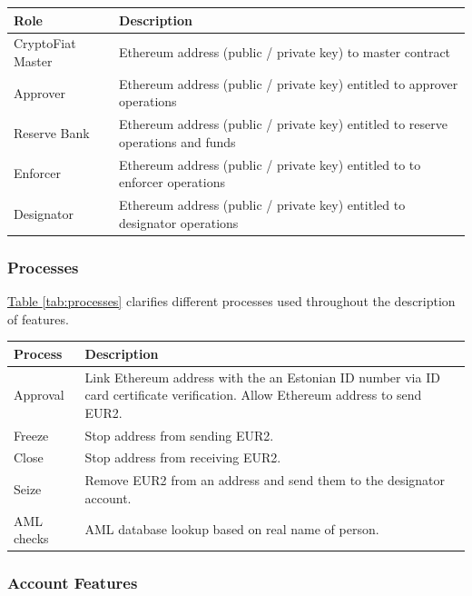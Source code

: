 \documentclass[a4paper,12pt]{article} %
\newcommand{\hypertableref}[1]{\hyperref[#1]{Table \ref{#1}}}
\begin{document}
{{\begin{center}
\begin{tabular}{ | p{3cm} | p{12cm} | }
 \hline
 Role & Description
 \\ \hline\hline
 CryptoFiat Master & Ethereum address (public / private key) to master contract
 \\ \hline
 Approver & Ethereum address (public / private key) entitled to approver operations
 \\ \hline
 Reserve Bank & Ethereum address (public / private key) entitled to reserve operations and funds
 \\ \hline
 Enforcer & Ethereum address (public / private key) entitled to to enforcer operations
 \\ \hline
 Designator & Ethereum address (public / private key) entitled to designator operations
 \\ \hline
\end{tabular}
\end{center}
\label{tab:roles}

\subsubsection{Processes} \label{sssec:3.3:processes}

\hypertableref{tab:processes} clarifies different processes used throughout the description of features.

\begin{center}
\begin{tabular}{ | p{3cm} | p{12cm} | }
 \hline
 Process & Description
 \\ \hline\hline
 Approval & Link Ethereum address with the an Estonian ID number via ID card certificate verification. Allow Ethereum address to send EUR2.
 \\ \hline
 Freeze & Stop address from sending EUR2.
 \\ \hline
 Close & Stop address from receiving EUR2.
 \\ \hline
 Seize & Remove EUR2 from an address and send them to the designator account.
 \\ \hline
 AML checks & AML database lookup based on real name of person.
 \\ \hline
\end{tabular}
\end{center}
\label{tab:processes}

\subsubsection{Account Features} \label{sssec:3.3:accounts}

}}
\end{document}
